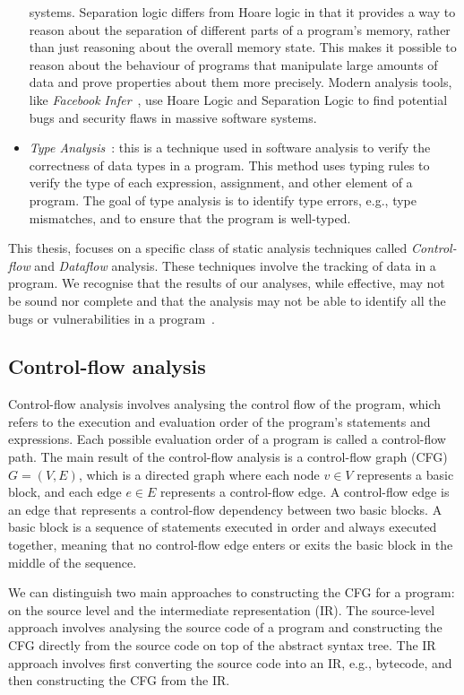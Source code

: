 \begin{itemize}
  systems. Separation logic differs from Hoare logic in that it provides a way to
  reason about the separation of different parts of a program's memory, rather
  than just reasoning about the overall memory state. This makes it possible to
  reason about the behaviour of programs that manipulate large amounts of data and
  prove properties about them more precisely.
  Modern analysis tools, like \emph{Facebook Infer}~\cite{calcagno2011infer},
  use Hoare Logic and Separation Logic to find potential bugs
  and security flaws in massive software systems.
  \item \emph{Type Analysis}~\cite{pierce2002types}: this is a technique used in software analysis to verify
  the correctness of data types in a program. This method uses typing rules to verify
  the type of each expression, assignment, and other element of a program.
  The goal of type analysis is to identify type errors, e.g., type mismatches,
  and to ensure that the program is well-typed.
\end{itemize}
This thesis, focuses on a specific class of static analysis techniques
called \emph{Control-flow} and \emph{Dataflow} analysis. These techniques involve the
tracking of data in a program.
We recognise that the results of our analyses, while effective,
may not be sound nor complete and that the analysis may not be able to identify
all the bugs or vulnerabilities in a program~\cite{livshits2015defense}.





\subsection{Control-flow analysis}
Control-flow analysis involves analysing the control flow of the program, which refers
to the execution and evaluation order of the program's statements and expressions.
Each possible evaluation order of a program is called a control-flow path.
The main result of the control-flow analysis is a control-flow graph (CFG) $G=(V,E)$,
which is a directed graph where each node $v \in V$ represents a basic block,
and each edge $e \in E$ represents a control-flow edge. 
A control-ﬂow edge is an edge that represents a control-ﬂow dependency between 
two basic blocks. A basic block is a sequence of statements executed in order 
and always executed together, meaning that no control-ﬂow edge enters or exits 
the basic block in the middle of the sequence.

We can distinguish two main approaches to constructing the CFG for a program:
on the source level and the intermediate representation (IR). The source-level approach
involves analysing the source code of a program and constructing the CFG
directly from the source code on top of the abstract syntax tree. The IR approach involves
first converting the source code into an IR, e.g., bytecode,
and then constructing the CFG from the IR.%

